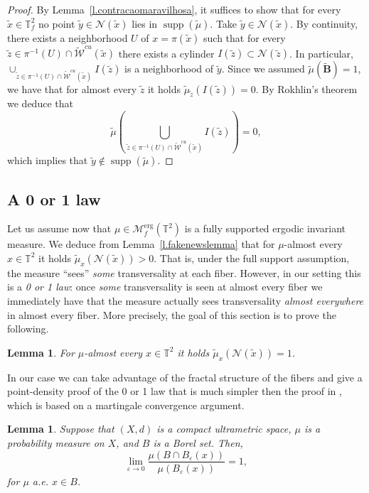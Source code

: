 \documentclass[a4paper,11pt,reqno]{amsart}
\newcommand{\TT}{{\mathbb{T}^2}}
\newcommand{\TTf}{{\mathbb{T}_f^2}}
\newcommand{\cM}{{\mathcal M}}
\newcommand{\cN}{{\mathcal N}}
\newcommand{\cW}{{\mathcal W}}
\newcommand{\tix}{\tilde{x}}
\newtheorem{lemma}[theorem]{Lemma}
\theoremstyle{definition}
\begin{document}
\begin{proof}
By Lemma~\ref{l.contracaomaravilhosa}, it suffices to show that for every $\tix\in\TTf
$ no point $\tilde{y}\in\cN(\tix)$ lies in $\operatorname{supp}(\tilde{\mu})$. Take $\tilde{y}\in\cN(\tix)$. By continuity, there exists a neighborhood $U$ of $x=\pi(\tix)$ such that for every $\tilde{z}\in \pi^{-1}(U)\cap\tilde{\cW}^{cu}(\tix)$ there exists a cylinder $I(\tilde{z})\subset\cN(\tilde{z})$. In particular, $\cup_{\tilde{z}\in \pi^{-1}(U)\cap\tilde{\cW}^{cu}(\tix)}I(\tilde{z})$ is a neighborhood of $\tilde{y}$. Since we assumed $\tilde{\mu}(\tilde{\mathbf{B}})=1$, we have that for almost every $\tilde{z}$ it holds $\tilde{\mu}_{\tilde{z}}(I(\tilde{z}))=0$. By Rokhlin's theorem we deduce that 
\[
\tilde{\mu}\left(\bigcup_{\tilde{z}\in \pi^{-1}(U)\cap\tilde{\cW}^{cu}(\tix)}I(\tilde{z})\right)=0,
\] 
which implies that $\tilde{y}\notin\operatorname{supp}(\tilde{\mu})$.
\end{proof}


\subsection{A 0 or 1 law}
\label{sec:0-ou-1}

Let us assume now that $\mu\in\cM^{\operatorname{erg}}_f(\TT)$ is a fully supported ergodic invariant measure. We deduce from Lemma~\ref{l.fakenewslemma} that for $\mu$-almost every $x\in\TT$ it holds $\tilde{\mu}_x(\cN(\tix))>0$. That is, under the full support assumption, the measure ``sees'' \emph{some} transversality at each fiber. However, in our setting this is a \emph{0 or 1 law}: once \emph{some} transversality is seen at almost every fiber we immediately have that the measure actually sees transversality \emph{almost everywhere} in almost every fiber. More precisely, the goal of this section is to prove the following.

\begin{lemma}
\label{lem:zeroum}
For $\mu$-almost every $x\in\TT$ it holds $\tilde{\mu}_x(\cN(\tix))=1$.
\end{lemma} 

In our case we can take advantage of the fractal structure of the fibers and give a point-density proof of the 0 or 1 law that is much simpler then the proof in \cite{ALOS}, which is based on a martingale convergence argument.

\begin{lemma}{\cite[Proposition 2.10]{miller2008existence}}
	\label{lem:miller}
Suppose that $(X,d)$ is a compact ultrametric space, $\mu$ is a probability measure on $X$, and $B$ is a Borel set. Then,
\[
\lim_{\varepsilon\to 0}\frac{\mu(B\cap B_{\varepsilon}(x))}{\mu(B_{\varepsilon}(x))}=1,
\]
for $\mu$ a.e. $x\in B$.
\end{lemma}
\end{document}
